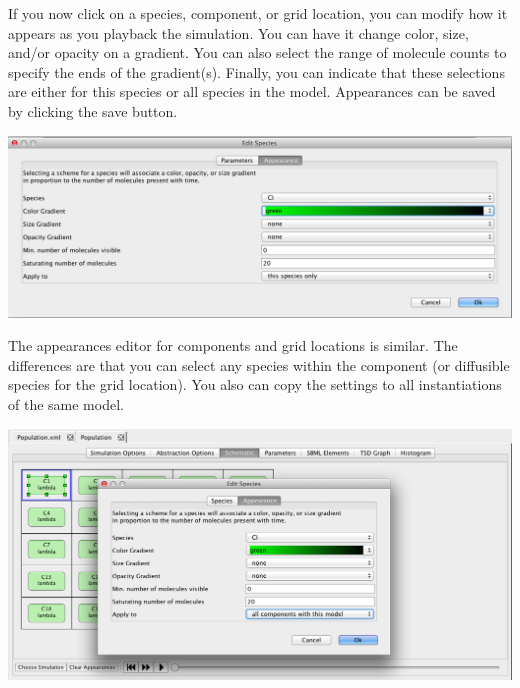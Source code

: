 \documentclass[titlepage,11pt]{article}
\begin{document}
If you now click on a species, component, or grid location, you can modify how it appears as you playback the simulation.  You can have it change color, size, and/or opacity on a gradient.  You can also select the range of molecule counts to specify the ends of the gradient(s).  Finally, you can indicate that these selections are either for this species or all species in the model.  Appearances can be saved by clicking the save button.

\begin{center}
\includegraphics[width=160mm]{screenshots/editSpeciesAppearance}
\end{center}

The appearances editor for components and grid locations is similar.  The differences are that you can select any species within the component (or diffusible species for the grid location).  You also can copy the settings to all instantiations of the same model.

\begin{center}
\includegraphics[width=160mm]{screenshots/compAppearances}
\end{center}
\end{document}

